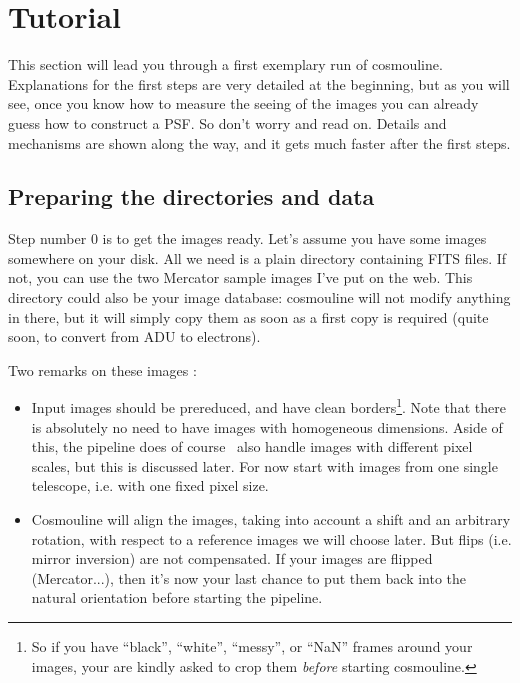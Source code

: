 

\section{Tutorial}


This section will lead you through a first exemplary run of cosmouline. Explanations for the first steps are very detailed at the beginning, but as you will see, once you know how to measure the seeing of the images you can already guess how to construct a PSF.
So don't worry and read on. Details and mechanisms are shown along the way, and it gets much faster after the first steps.


\subsection{Preparing the directories and data}

Step number 0 is to get the images ready. Let's assume you have some images somewhere on your disk. All we need is a plain directory containing FITS files. If not, you can use the two Mercator sample images I've put on the web. This directory could also be your image database: cosmouline will not modify anything in there, but it will simply copy them as soon as a first copy is required (quite soon, to convert from ADU to electrons).


Two remarks on these images :

\begin{itemize}

\item Input images should be prereduced, and have clean borders\footnote{So if you have ``black'', ``white'', ``messy'', or ``NaN'' frames around your images, your are kindly asked to crop them \emph{before} starting cosmouline.}.
Note that there is absolutely no need to have images with homogeneous dimensions. Aside of this, the pipeline does of course \smiley\, also handle images with different pixel scales, but this is discussed later. For now start with images from one single telescope, i.e. with one fixed pixel size.

\item Cosmouline will align the images, taking into account a shift and an arbitrary rotation, with respect to a reference images we will choose later. But flips (i.e. mirror inversion) are not compensated. If your images are flipped (Mercator...), then it's now your last chance to put them back into the natural orientation before starting the pipeline.

\end{itemize}


